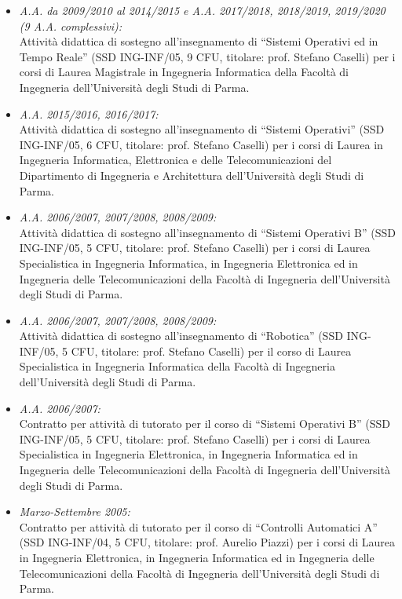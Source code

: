 \documentclass[11pt]{article}
\newcommand{\ITEMDATE}[1]{\item \textit{#1:}\\}
\begin{document}
\begin{itemize}

\ITEMDATE{A.A. da 2009/2010 al 2014/2015 e A.A. 2017/2018, 2018/2019, 2019/2020 (9 A.A. complessivi)} 
Attivit\`a didattica di sostegno all'insegnamento di ``Sistemi Operativi ed in Tempo Reale'' 
(SSD ING-INF/05, 9 CFU, titolare: prof. Stefano Caselli)
per i corsi di Laurea Magistrale in Ingegneria Informatica
della Facolt\`a di Ingegneria dell'Universit\`a degli Studi di Parma.

\ITEMDATE{A.A. 2015/2016, 2016/2017} 
Attivit\`a didattica di sostegno all'insegnamento di ``Sistemi Operativi'' 
(SSD ING-INF/05, 6 CFU, titolare: prof. Stefano Caselli)
per i corsi di Laurea in Ingegneria Informatica, Elettronica e delle Telecomunicazioni
del Dipartimento di Ingegneria e Architettura dell'Universit\`a degli Studi di Parma.

\ITEMDATE{A.A. 2006/2007, 2007/2008, 2008/2009} 
Attivit\`a didattica di sostegno all'insegnamento di ``Sistemi Operativi B'' (SSD ING-INF/05, 5 CFU, titolare: prof. Stefano Caselli)
per i corsi di Laurea Specialistica in Ingegneria Informatica, in Ingegneria Elettronica ed in Ingegneria delle Telecomunicazioni
della Facolt\`a di Ingegneria dell'Universit\`a degli Studi di Parma.

\ITEMDATE{A.A. 2006/2007, 2007/2008, 2008/2009} 
Attivit\`a didattica di sostegno all'insegnamento di ``Robotica'' (SSD ING-INF/05, 5 CFU, titolare: prof. Stefano Caselli)
per il corso di Laurea Specialistica in Ingegneria Informatica 
della Facolt\`a di Ingegneria dell'Universit\`a degli Studi di Parma.

\ITEMDATE{A.A. 2006/2007} 
Contratto per attivit\`a di tutorato per il corso di ``Sistemi Operativi B'' (SSD ING-INF/05, 5 CFU, titolare: prof. Stefano Caselli)
per i corsi di Laurea Specialistica in Ingegneria Elettronica, in Ingegneria Informatica ed in Ingegneria delle Telecomunicazioni 
della Facolt\`a di Ingegneria dell'Universit\`a degli Studi di Parma.

\ITEMDATE{Marzo-Settembre 2005}
Contratto per attivit\`a di tutorato per il corso di ``Controlli Automatici A'' (SSD ING-INF/04, 5 CFU, titolare: prof. Aurelio Piazzi) 
per i corsi di Laurea in Ingegneria Elettronica, in Ingegneria Informatica ed in Ingegneria delle Telecomunicazioni 
della Facolt\`a di Ingegneria dell'Universit\`a degli Studi di Parma. 
\end{itemize}


\end{document}
